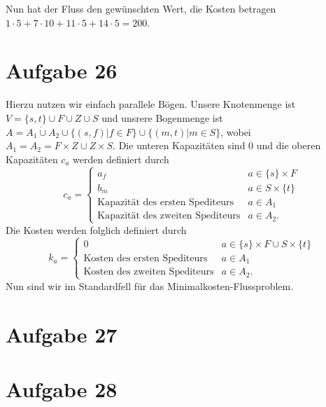 \documentclass[a4paper,12pt,german]{scrartcl}
\begin{document}
 Nun hat der Fluss den gewünschten Wert, die Kosten betragen $1\cdot 5+7\cdot 10+11\cdot 5+14\cdot 5=200$.
 \section*{Aufgabe 26}
 Hierzu nutzen wir einfach parallele Bögen. Unsere Knotenmenge ist $V=\{s,t\}\cup F\cup Z\cup S$ und unsrere Bogenmenge ist $A=A_1\dot\cup A_2\cup \{(s,f)|f\in F\}\cup\{(m,t)|m\in S\}$, wobei $A_1=A_2=F\times Z\cup Z\times S$. Die unteren Kapazitäten sind 0 und die oberen Kapazitäten $c_a$ werden definiert durch
 $$c_a=\begin{cases} a_f&a\in\{s\}\times F\\
                     b_m&a\in S\times\{t\}\\
                     \text{Kapazität des ersten Spediteurs}&a\in A_1\\
                     \text{Kapazität des zweiten Spediteurs}&a\in A_2.
       \end{cases}$$
 Die Kosten werden folglich definiert durch
 $$k_a=\begin{cases} 0&a\in\{s\}\times F\cup S\times\{t\}\\
                     \text{Kosten des ersten Spediteurs}&a\in A_1\\
                     \text{Kosten des zweiten Spediteurs}&a\in A_2.
       \end{cases}$$
 Nun sind wir im Standardfell für das Minimalkosten-Flussproblem.
\section*{Aufgabe 27}
\section*{Aufgabe 28}
\end{document}
